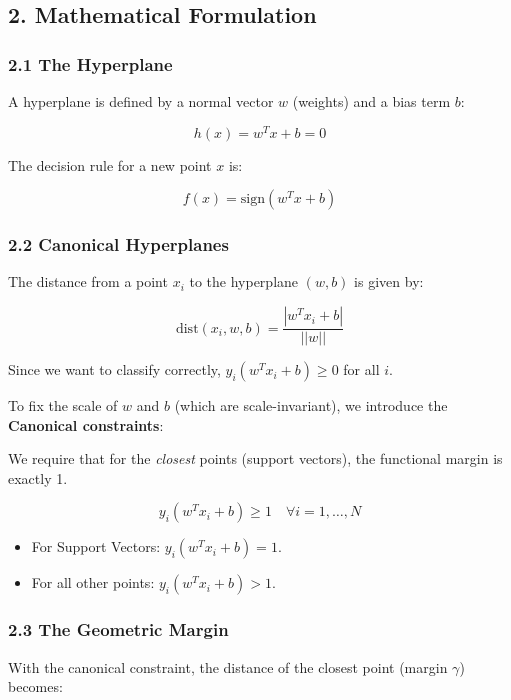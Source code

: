 \documentclass[
  italian,
  11pt,
]{article}
\begin{document}
\subsection{2. Mathematical
Formulation}\label{mathematical-formulation-2}

\subsubsection{2.1 The Hyperplane}\label{the-hyperplane}

A hyperplane is defined by a normal vector \(w\) (weights) and a bias
term \(b\):

\[h(x) = w^T x + b = 0\]

The decision rule for a new point \(x\) is:

\[f(x) = \text{sign}(w^T x + b)\]

\subsubsection{2.2 Canonical Hyperplanes}\label{canonical-hyperplanes}

The distance from a point \(x_i\) to the hyperplane \((w, b)\) is given
by:

\[\text{dist}(x_i, w, b) = \frac{|w^T x_i + b|}{||w||}\]

Since we want to classify correctly, \(y_i(w^T x_i + b) \geq 0\) for all
\(i\).

To fix the scale of \(w\) and \(b\) (which are scale-invariant), we
introduce the \textbf{Canonical constraints}:

We require that for the \emph{closest} points (support vectors), the
functional margin is exactly 1.

\[y_i (w^T x_i + b) \geq 1 \quad \forall i=1, \dots, N\]

\begin{itemize}
\item
  For Support Vectors: \(y_i (w^T x_i + b) = 1\).
\item
  For all other points: \(y_i (w^T x_i + b) > 1\).
\end{itemize}

\subsubsection{2.3 The Geometric Margin}\label{the-geometric-margin}

With the canonical constraint, the distance of the closest point (margin
\(\gamma\)) becomes:
\end{document}
